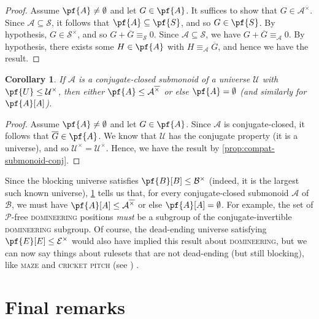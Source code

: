 \documentclass[11pt]{article}
\newtheorem{corollary}[theorem]{Corollary}
\theoremstyle{definition}
\newcommand{\set}[1]{\mathcal{#1}}
\begin{document}
\begin{proof}
    Assume $\pf{A}\neq\emptyset$ and let $G\in\pf{A}$. It suffices to show that
    $G\in\set{A}^{\overline{\times}}$. Since $\set{A}\subseteq\set{S}$, it
    follows that $\pf{A}\subseteq\pf{S}$, and so $G\in\pf{S}$. By hypothesis,
    $G\in\set{S}^{\overline{\times}}$, and so $G+\overline{G}\equiv_\set{S}0$.
    Since $\set{A}\subseteq\set{S}$, we have $G+\overline{G}\equiv_\set{A}0$.
    By hypothesis, there exists some $H\in\pf{A}$ with
    $H\equiv_\set{A}\overline{G}$, and hence we have the result.
\end{proof}

\begin{corollary}
    \label{cor:compat-submonoid}
    If $\set{A}$ is a conjugate-closed submonoid of a universe $\set{U}$ with
    $\pf{U}\leq\set{U}^\times$, then either
    $\pf{A}\leq\set{A}^{\overline{\times}}$ or else $\pf{A}=\emptyset$ (and
    similarly for $\pf{A}[A]$).
\end{corollary}

\begin{proof}
    Assume $\pf{A}\neq\emptyset$ and let $G\in\pf{A}$. Since $\set{A}$ is
    conjugate-closed, it follows that $\overline{G}\in\pf{A}$. We know that
    $\set{U}$ has the conjugate property (it is a universe), and so
    $\set{U}^\times=\set{U}^{\overline{\times}}$. Hence, we have the result by
    \cref{prop:compat-submonoid-conj}.
\end{proof}

Since the blocking universe satisfies $\pf{B}[B]\leq\set{B}^\times$ (indeed, it
is the largest such known universe), \cref{cor:compat-submonoid} tells us that,
for every conjugate-closed submonoid $\set{A}$ of $\set{B}$, we must have
$\pf{A}[A]\leq\set{A}^{\overline{\times}}$ or else $\pf{A}[A]=\emptyset$. For
example, the set of $\mathscr{P}$-free \textsc{domineering} positions
\emph{must} be a subgroup of the conjugate-invertible \textsc{domineering}
subgroup. Of course, the dead-ending universe satisfying
$\pf{E}[E]\leq\set{E}^\times$ would also have implied this result about
\textsc{domineering}, but we can now say things about rulesets that are not
dead-ending (but still blocking), like \textsc{maze} and \textsc{cricket pitch}
(see \cite[pp.~306, 311]{albert.nowakowski.ea:lessons}) .

\section{Final remarks}
\label{sec:final-remarks}
\end{document}
